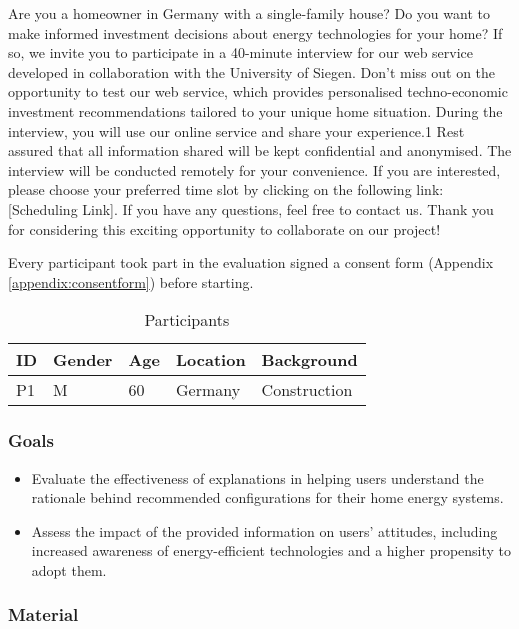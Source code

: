 Are you a homeowner in Germany with a single-family house? 
Do you want to make informed investment decisions about energy technologies for your home? 
If so, we invite you to participate in a 40-minute interview for our web service developed in collaboration with the University of Siegen.
Don't miss out on the opportunity to test our web service, which provides personalised techno-economic investment recommendations tailored to your unique home situation. 
During the interview, you will use our online service and share your experience.1
Rest assured that all information shared will be kept confidential and anonymised. 
The interview will be conducted remotely for your convenience.
If you are interested, please choose your preferred time slot by clicking on the following link: [Scheduling Link]. 
If you have any questions, feel free to contact us.
Thank you for considering this exciting opportunity to collaborate on our project!

Every participant took part in the evaluation signed a consent form (Appendix \ref{appendix:consentform}) before starting. 

\begin{table}[h!]
  \centering
  \begin{tabular}{ | p{} | p{} | p{} | p{} | p{} | } 
    \hline
    ID & Gender & Age & Location & Background \\
    \hline
    P1 & M & 60 & Germany & Construction \\
    \hline
  \end{tabular}
  \caption{Participants}
  \label{tab:participants}
\end{table}


\subsubsection{Goals}

\begin{itemize}
  \item Evaluate the effectiveness of explanations in helping users understand the rationale behind recommended configurations for their home energy systems.
  \item Assess the impact of the provided information on users' attitudes, including increased awareness of energy-efficient technologies and a higher propensity to adopt them. 
\end{itemize}


\subsubsection{Material}

